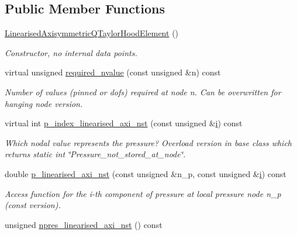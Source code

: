 \subsection*{Public Member Functions}
\begin{DoxyCompactItemize}
\item 
\hyperlink{classoomph_1_1LinearisedAxisymmetricQTaylorHoodElement_ad7aec210755232b929a8af61c0f459cc}{Linearised\+Axisymmetric\+Q\+Taylor\+Hood\+Element} ()
\begin{DoxyCompactList}\small\item\em Constructor, no internal data points. \end{DoxyCompactList}\item 
virtual unsigned \hyperlink{classoomph_1_1LinearisedAxisymmetricQTaylorHoodElement_a4c7623e7e58ee1381789a1ac98a5a7d2}{required\+\_\+nvalue} (const unsigned \&n) const
\begin{DoxyCompactList}\small\item\em Number of values (pinned or dofs) required at node n. Can be overwritten for hanging node version. \end{DoxyCompactList}\item 
virtual int \hyperlink{classoomph_1_1LinearisedAxisymmetricQTaylorHoodElement_aba8d88861814753c5aeeb26f0985c3d9}{p\+\_\+index\+\_\+linearised\+\_\+axi\+\_\+nst} (const unsigned \&\hyperlink{cfortran_8h_adb50e893b86b3e55e751a42eab3cba82}{i}) const
\begin{DoxyCompactList}\small\item\em Which nodal value represents the pressure? Overload version in base class which returns static int \char`\"{}\+Pressure\+\_\+not\+\_\+stored\+\_\+at\+\_\+node\char`\"{}. \end{DoxyCompactList}\item 
double \hyperlink{classoomph_1_1LinearisedAxisymmetricQTaylorHoodElement_a6b894b749efd765d1da22cb509b12b0f}{p\+\_\+linearised\+\_\+axi\+\_\+nst} (const unsigned \&n\+\_\+p, const unsigned \&\hyperlink{cfortran_8h_adb50e893b86b3e55e751a42eab3cba82}{i}) const
\begin{DoxyCompactList}\small\item\em Access function for the i-\/th component of pressure at local pressure node n\+\_\+p (const version). \end{DoxyCompactList}\item 
unsigned \hyperlink{classoomph_1_1LinearisedAxisymmetricQTaylorHoodElement_a90f9c61947bb1abe64e29f9bf1c204b6}{npres\+\_\+linearised\+\_\+axi\+\_\+nst} () const

\end{DoxyCompactItemize}
